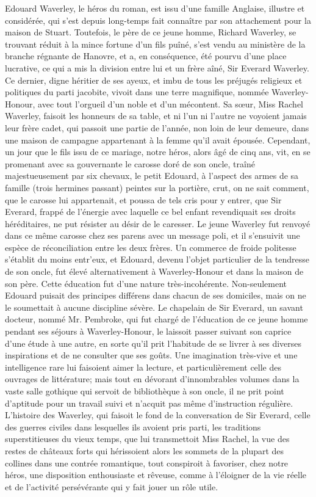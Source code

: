 Edouard Waverley, le héros du roman, est issu d'une famille Anglaise, illustre et considérée, qui s'est depuis long-temps fait connaître par son attachement pour la maison de Stuart. Toutefois, le père de ce jeune homme, Richard Waverley, se trouvant réduit à la mince fortune d'un fils puîné, s'est vendu au ministère de la branche régnante de Hanovre, et a, en conséquence, été pourvu d'une place lucrative, ce qui a mis la division entre lui et un frère aîné, Sir Everard Waverley. Ce dernier, digne héritier de ses ayeux, et imbu de tous les préjugés religieux et politiques du parti jacobite, vivoit dans une terre magnifique, nommée Waverley-Honour, avec tout l'orgueil d'un noble et d'un mécontent. Sa sœur, Miss Rachel Waverley, faisoit les honneurs de sa table, et ni l'un ni l'autre ne voyoient jamais leur frère cadet, qui passoit une partie de l'année, non loin de leur demeure, dans une maison de\setcounter{page}{537} campagne appartenant à la femme qu'il avait épousée. Cependant, un jour que le fils issu de ce mariage, notre héros, alors âgé de cinq ans, vit, en se promenant avec sa gouvernante le carosse doré de son oncle, traîné majestueusement par six chevaux, le petit Edouard, à l'aspect des armes de sa famille (trois hermines passant) peintes sur la portière, crut, on ne sait comment, que le carosse lui appartenait, et poussa de tels cris pour y entrer, que Sir Everard, frappé de l'énergie avec laquelle ce bel enfant revendiquait ses droits héréditaires, ne put résister au désir de le caresser. Le jeune Waverley fut renvoyé dans ce même carosse chez ses parens avec un message poli, et il s'ensuivit une espèce de réconciliation entre les deux frères. Un commerce de froide politesse s'établit du moins entr'eux, et Edouard, devenu l'objet particulier de la tendresse de son oncle, fut élevé alternativement à Waverley-Honour et dans la maison de son père.
Cette éducation fut d'une nature très-incohérente. Non-seulement Edouard puisait des principes différens dans chacun de ses domiciles, mais on ne le soumettait à aucune discipline sévère. Le chapelain de Sir Everard, un savant docteur, nommé Mr. Pembroke, qui fut chargé de l'éducation de\setcounter{page}{538} ce jeune homme pendant ses séjours à Waverley-Honour, le laissoit passer suivant son caprice d’une étude à une autre, en sorte qu’il prit l’habitude de se livrer à ses diverses inspirations et de ne consulter que ses goûts. Une imagination très-vive et une intelligence rare lui faisoient aimer la lecture, et particulièrement celle des ouvrages de littérature; mais tout en dévorant d’innombrables volumes dans la vaste salle gothique qui servoit de bibliothèque à son oncle, il ne prit point d’aptitude pour un travail suivi et n’acquit pas même d’instruction régulière. L’histoire des Waverley, qui faisoit le fond de la conversation de Sir Everard, celle des guerres civiles dans lesquelles ils avoient pris parti, les traditions superstitieuses du vieux temps, que lui transmettoit Miss Rachel, la vue des restes de châteaux forts qui hérissoient alors les sommets de la plupart des collines dans une contrée romantique, tout conspiroit à favoriser, chez notre héros, une disposition enthousiaste et rêveuse, comme à l’éloigner de la vie réelle et de l’activité persévérante qui y fait jouer un rôle utile.
